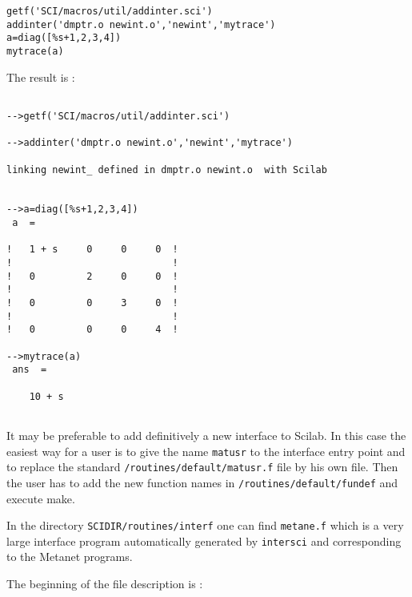 \begin{verbatim}
getf('SCI/macros/util/addinter.sci')
addinter('dmptr.o newint.o','newint','mytrace')
a=diag([%s+1,2,3,4])
mytrace(a)
\end{verbatim}


The result is :

\begin{verbatim}

-->getf('SCI/macros/util/addinter.sci')
 
-->addinter('dmptr.o newint.o','newint','mytrace')

linking newint_ defined in dmptr.o newint.o  with Scilab 

 
-->a=diag([%s+1,2,3,4])
 a  =
 
!   1 + s     0     0     0  !
!                            !
!   0         2     0     0  !
!                            !
!   0         0     3     0  !
!                            !
!   0         0     0     4  !
 
-->mytrace(a)
 ans  =
 
    10 + s   
 
\end{verbatim}

It may be preferable to add definitively a new interface to Scilab.
In this case the easiest way for a user is to give the name {\tt matusr} to the
interface entry point and to replace the standard 
{\tt <scilab dir>/routines/default/matusr.f} file by his own file. Then the 
user has to add the new function names in {\tt <scilab dir>/routines/default/fundef} and execute make.


In the directory {\tt SCIDIR/routines/interf} one can find {\tt metane.f} 
which is a very large interface program automatically generated by 
{\tt intersci} and corresponding to the Metanet programs. 

The beginning of the file description is :

